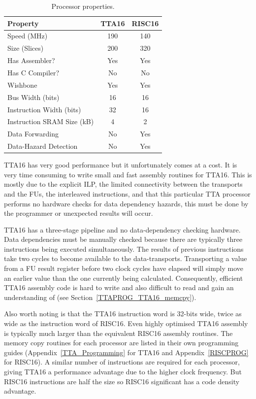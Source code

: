 \begin{table}[h!]
\begin{center}
\begin{tabular}{l c c}
Property					& TTA16	& RISC16	\\
\hline
Speed (MHz)					&	190	&	140		\\
Size (Slices)				&	200	&	320		\\
Has Assembler?				&	Yes	&	Yes		\\
Has C Compiler?				&	No	&	No		\\
Wishbone					&	Yes	&	Yes		\\
Bus Width (bits)			&	16	&	16		\\
Instruction Width (bits)	&	32	&	16		\\
Instruction SRAM Size (kB)	&	4	&	2		\\
Data Forwarding				&	No	&	Yes		\\
Data-Hazard Detection		&	No	&	Yes		\\
\end{tabular}
\end{center}
\caption[Processor properties]{Processor properties.}
\label{CPU_Table}
\end{table}

TTA16 has very good performance but it unfortunately comes at a cost. It is very
time consuming to write small and fast assembly routines for TTA16. This is
mostly due to the explicit ILP, the limited connectivity between the transports
and the FUs, the interleaved instructions, and that this particular TTA processor
performs no hardware checks for data dependency hazards, this must be done by the
programmer or unexpected results will occur.

TTA16 has a three-stage pipeline and no data-dependency checking hardware. Data
dependencies must be manually checked because there are typically three
instructions being executed simultaneously. The results of previous instructions
take two cycles to become available to the data-transports. Transporting a value
from a FU result register before two clock cycles have elapsed will simply move
an earlier value than the one currently being calculated. Consequently, efficient
TTA16 assembly code is hard to write and also difficult to read and gain an
understanding of (see Section~\ref{TTAPROG_TTA16_memcpy}).

Also worth noting is that the TTA16 instruction word is 32-bits wide, twice as
wide as the instruction word of RISC16. Even highly optimised TTA16 assembly is
typically much larger than the equivalent RISC16 assembly routines. The memory
copy routines for each processor are listed in their own programming guides
(Appendix~\ref{TTA_Programming} for TTA16 and Appendix~\ref{RISCPROG} for
RISC16). A similar number of instructions are required for each processor, giving
TTA16 a performance advantage due to the higher clock frequency. But RISC16
instructions are half the size so RISC16 significant has a code density
advantage.
